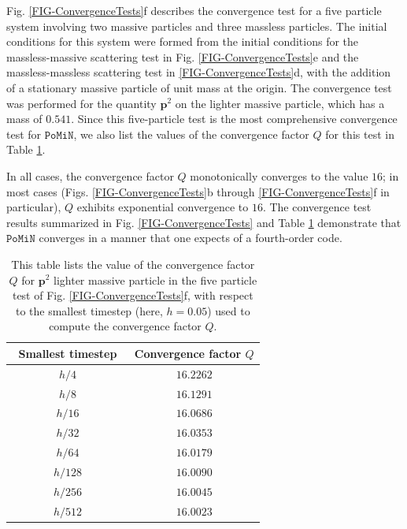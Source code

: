 \documentclass[aps,onecolumn,notitlepage,eqsecnum,nofootinbib,floatfix,superscriptaddress]{revtex4-1}
\newcommand{\codename}{\mathtt{PoMiN}}
\begin{document}
Fig. \ref{FIG-ConvergenceTests}f describes the convergence test for a five particle system involving two massive particles and three massless particles. The initial conditions for this system were formed from the initial conditions for the massless-massive scattering test in Fig. \ref{FIG-ConvergenceTests}e and the massless-massless scattering test in \ref{FIG-ConvergenceTests}d, with the addition of a stationary massive particle of unit mass at the origin. The convergence test was performed for the quantity $\textbf{p}^2$ on the lighter massive particle, which has a mass of $0.541$. Since this five-particle test is the most comprehensive convergence test for $\codename$, we also list the values of the convergence factor $Q$ for this test in Table \ref{TAB-ConvergenceFive}.

In all cases, the convergence factor $Q$ monotonically converges to the value $16$; in most cases (Figs. \ref{FIG-ConvergenceTests}b through \ref{FIG-ConvergenceTests}f in particular), $Q$ exhibits exponential convergence to $16$. The convergence test results summarized in Fig. \ref{FIG-ConvergenceTests} and Table \ref{TAB-ConvergenceFive} demonstrate that $\codename$ converges in a manner that one expects of a fourth-order code.

\begin{table} 
\centering
\begin{tabular}{|c|c|}
\hline
$\>$ Smallest timestep $\>$ & Convergence factor $Q$\\
\hline
${h}/{4}$  &  $\>$ $16.2262$ $\>$  \\
\hline
${h}/{8}$  &  $\>$ $16.1291$ $\>$  \\
\hline
${h}/{16}$  &  $\>$ $16.0686$ $\>$  \\
\hline
${h}/{32}$  &  $\>$ $16.0353$ $\>$  \\
\hline
${h}/{64}$  &  $\>$ $16.0179$ $\>$  \\
\hline
${h}/{128}$  &  $\>$ $16.0090$ $\>$  \\
\hline
${h}/{256}$  &  $\>$ $16.0045$ $\>$  \\
\hline
${h}/{512}$  &  $\>$ $16.0023$ $\>$  \\
\hline
\end{tabular}
\caption{This table lists the value of the convergence factor $Q$ for $\textbf{p}^2$ lighter massive particle in the five particle test of Fig. \ref{FIG-ConvergenceTests}f, with respect to the smallest timestep (here, $h=0.05$) used to compute the convergence factor $Q$.} \label{TAB-ConvergenceFive}
\end{table}
\end{document}
